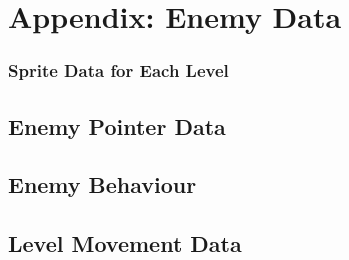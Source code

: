 \chapter{Appendix: Enemy Data}
\subsection{Sprite Data for Each Level}


\section{Enemy Pointer Data}


\section{Enemy Behaviour}


\section{Level Movement Data}


